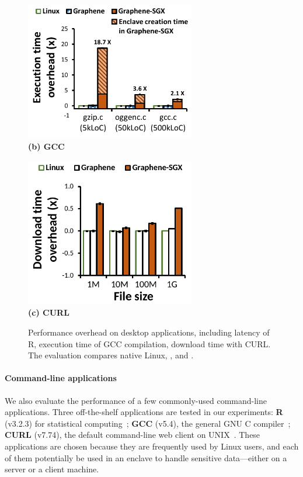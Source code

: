 \begin{figure}[t!]
\centering
\footnotesize
\begin{minipage}{.49\textwidth}
\centering
\includegraphics[width=20em]{sgx/gcc-overhead}\\
\vspace{3pt}
{\bf (b) GCC}
\end{minipage}
\begin{minipage}{.49\textwidth}
\centering
\includegraphics[width=20em]{sgx/curl-overhead}\\
\vspace{3pt}
{\bf (c) CURL}
\end{minipage}
\caption{Performance overhead on desktop applications, including latency of R, execution time of GCC compilation, download time with CURL. The evaluation compares native Linux, \graphene{}, and \graphenesgx{}.} %
\label{fig:desktop-overhead}
\end{figure}



\paragraph{Command-line applications}


We also evaluate the performance of a few commonly-used command-line applications.
Three off-the-shelf applications are tested in our experiments:
{\bf R} (v3.2.3) for statistical computing~\cite{r-project}; {\bf GCC} (v5.4), the general GNU C compiler~\cite{gcc}; {\bf CURL} (v7.74), the default command-line web client on UNIX~\cite{curl}.
These applications are chosen because they are frequently used by Linux users,
and each of them potentially  be used 
in an enclave to handle sensitive data---either on a server or a client
machine.



